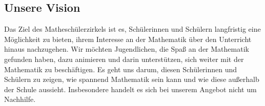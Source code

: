 \documentclass[12pt]{zettel}
\begin{document}


\subsection*{Unsere Vision}

Das Ziel des Matheschülerzirkels ist es, Schülerinnen und Schülern langfristig eine Möglichkeit zu bieten, ihrem Interesse an der Mathematik über den Unterricht hinaus nachzugehen. Wir möchten Jugendlichen, die Spaß an der Mathematik gefunden haben, dazu animieren und darin unterstützen, sich weiter mit der Mathematik zu beschäftigen. Es geht uns darum, diesen Schülerinnen und Schülern zu zeigen, wie spannend Mathematik sein kann und wie diese außerhalb der Schule aussieht. Insbesondere handelt es sich bei unserem Angebot nicht um Nachhilfe.
\end{document}
